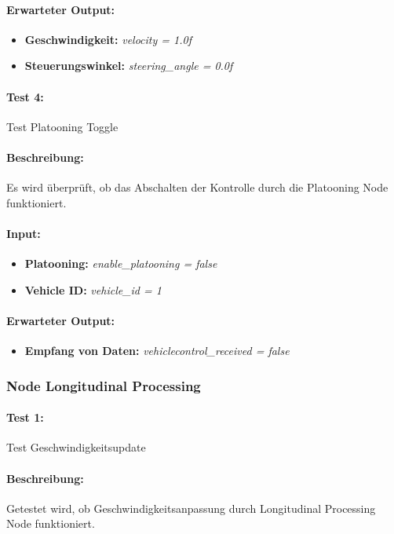 \documentclass[a4paper, 12pt, titlepage]{scrartcl}
\begin{document}
				\paragraph{Erwarteter Output:}
				\begin{itemize} \itemsep-0.5em
					\item \textbf{Geschwindigkeit:} \emph{velocity = 1.0f}
					\item \textbf{Steuerungswinkel:} \emph{steering\_angle = 0.0f}
				\end{itemize} 				

				\paragraph{Test 4:} {Test Platooning Toggle}
				\paragraph{Beschreibung:} Es wird überprüft, ob das Abschalten der Kontrolle durch die Platooning Node funktioniert.
				\paragraph{Input:}
				\begin{itemize} \itemsep-0.5em
					\item \textbf{Platooning:} \emph{enable\_platooning = false}
					\item \textbf{Vehicle ID:} \emph{vehicle\_id = 1}	
				\end{itemize}
				\paragraph{Erwarteter Output:}  
				\begin{itemize} \itemsep-0.5em
					\item \textbf{Empfang von Daten:} \emph{vehiclecontrol\_received = false}
				\end{itemize}
				
			\subsubsection{Node Longitudinal Processing}
			\label{node_longitudinal_processing}
			\paragraph{Test 1:}{Test Geschwindigkeitsupdate}
			\paragraph{Beschreibung:} Getestet wird, ob Geschwindigkeitsanpassung durch Longitudinal Processing Node funktioniert.
\end{document}
